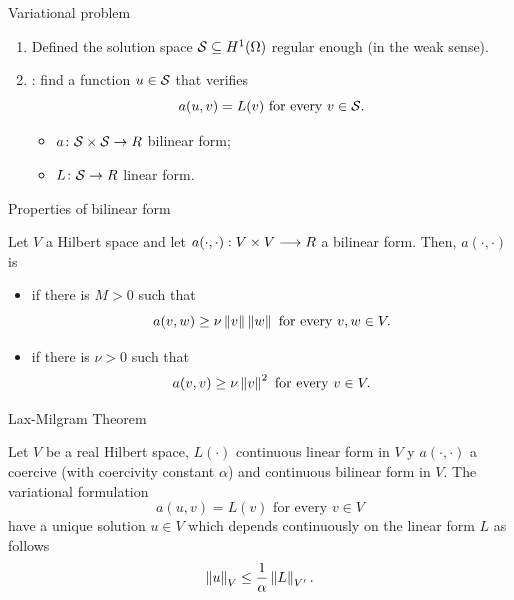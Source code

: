\begin{frame}{Variational problem}

\begin{enumerate}
	\item Defined the solution space $\S\subseteq H^1(\Omega)$  regular enough (in the weak sense).
	\item {}: find a function $u\in \S$ that verifies $$a(u,v)=L(v)\text{ for every }v\in \S.$$
		\begin{itemize}\itemsep1em
			\item $a\colon\S\times\S\to\R$ bilinear form; 
			\item $L\colon\S\to\R$ linear form.
		\end{itemize}
\end{enumerate}

\end{frame}

\begin{frame}{Properties of bilinear form}
	\begin{definicion}
		Let $V$ a Hilbert space and let $a(\cdot,\cdot):V\times V\longrightarrow\R$ a bilinear form. Then, $a(\cdot,\cdot)$ is
		\begin{itemize}
			\item {} if there is $M>0$ such that $$a(v,w)\geq\nu\norma{v}\norma{w}\text{ for every } v,w\in V.$$
			\item {} if there is $\nu>0$ such that $$a(v,v)\geq\nu\norma{v}^2\text{ for every } v\in V.$$
		\end{itemize}
	\end{definicion}
\end{frame}

\begin{frame}{Lax-Milgram Theorem}

\begin{theorem}
	\label{theorem:Lax_Milgram}
	Let $V$ be a real Hilbert space, $L(\cdot)$ continuous linear form in $V$ y $a(\cdot,\cdot)$ a coercive (with coercivity constant $\alpha$) and continuous bilinear form in $V$. The variational formulation $$a(u,v)=L(v)\text{ for every }v\in V$$ have a unique solution $u\in V$ which depends continuously on the linear form $L$ as follows
	$$\norma{u}_V\le \frac{1}{\alpha}\norma{L}_{V'}.$$
\end{theorem}

\end{frame}

